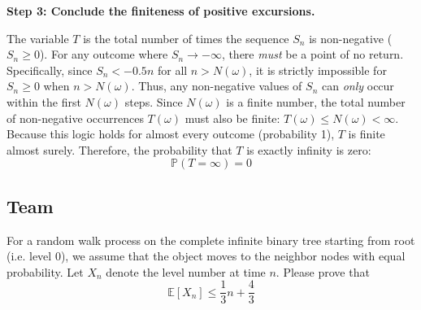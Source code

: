 \begin{solution}
\textbf{Step 3: Conclude the finiteness of positive excursions.}

The variable $T$ is the total number of times the sequence $S_n$ is non-negative ($S_n \geq 0$).
For any outcome where $S_n \to -\infty$, there \textit{must} be a point of no return. Specifically, since $S_n < -0.5n$ for all $n > N(\omega)$, it is strictly impossible for $S_n \geq 0$ when $n > N(\omega)$.
Thus, any non-negative values of $S_n$ can \textit{only} occur within the first $N(\omega)$ steps.
Since $N(\omega)$ is a finite number, the total number of non-negative occurrences $T(\omega)$ must also be finite: $T(\omega) \leq N(\omega) < \infty$.
Because this logic holds for almost every outcome (probability 1), $T$ is finite almost surely.
Therefore, the probability that $T$ is exactly infinity is zero:
\[ \mathbb{P}(T = \infty) = 0 \]
\end{solution}

\subsection{Team}

\begin{exercise}\label{probability:2016:7}
For a random walk process on the complete infinite binary tree starting from root (i.e. level 0), we assume that the object moves to the neighbor nodes with equal probability. Let $X_n$ denote the level number at time $n$. Please prove that
\[
\mathbb{E}[X_n] \leq \frac{1}{3}n + \frac{4}{3}
\]
\end{exercise}

